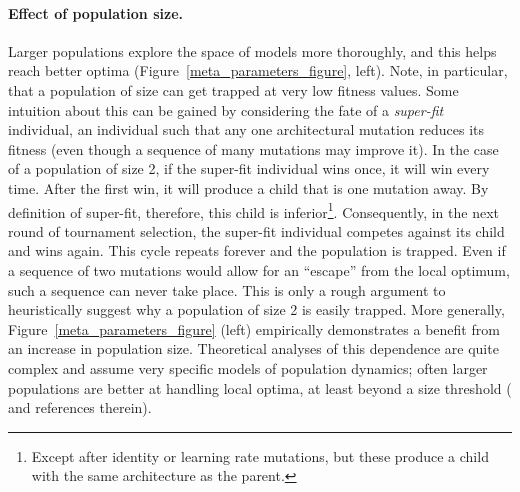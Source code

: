\documentclass{article}
\begin{document}
\vspace{-1em}
\paragraph{Effect of population size.} Larger populations explore the space of models more thoroughly, and this helps reach better optima (Figure~\ref{meta_parameters_figure}, left). Note, in particular, that a population of size  can get trapped at very low fitness values. Some intuition about this can be gained by considering the fate of a {\em super-fit} individual, \ie an individual such that any one architectural mutation reduces its fitness (even though a sequence of many mutations may improve it). In the case of a population of size 2, if the super-fit individual wins once, it will win every time. After the first win, it will produce a child that is one mutation away. By definition of super-fit, therefore, this child is inferior\footnote{Except after identity or learning rate mutations, but these produce a child with the same architecture as the parent.}. Consequently, in the next round of tournament selection, the super-fit individual competes against its child and wins again. This cycle repeats forever and the population is trapped. Even if a sequence of two mutations would allow for an ``escape'' from the local optimum, such a sequence can never take place. This is only a rough argument to heuristically suggest why a population of size 2 is easily trapped. More generally, Figure~\ref{meta_parameters_figure} (left) empirically demonstrates a benefit from an increase in population size. Theoretical analyses of this dependence are quite complex and assume very specific models of population dynamics; often larger populations are better at handling local optima, at least beyond a size threshold (\citet{weinreich2005rapid} and references therein).
\end{document}
